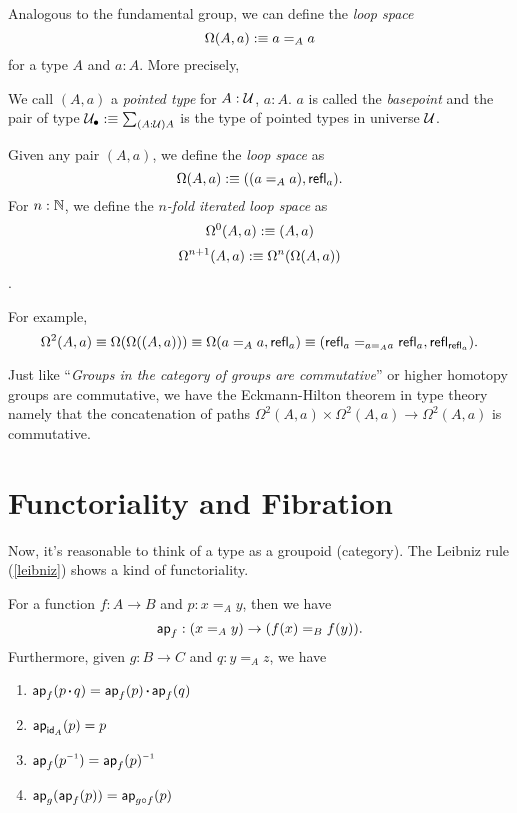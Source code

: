 Analogous to the fundamental group, we can define the {\it loop space} 
$$\Omega(A, a):\equiv a=_Aa$$ for a type $A$ and $a: A$. More precisely,

\newcommand{\pointed}{_\bullet}
\begin{definition}
    We call $(A, a)$ a {\it pointed type} for $A:\mathcal{U}$, $a:A$.
    $a$ is called the {\it basepoint} and the pair of type 
    $\universe\pointed\defn\sum_{(A:\universe)A}$ is the type of pointed 
    types in universe $\mathcal{U}$.
\end{definition}

\begin{definition}
    Given any pair $(A, a)$, we define the {\it loop space} as 
    $$ \Omega(A,a):\equiv ((a=_A a),\text{\sf refl}_a).$$
    For $n:\mathbb{N}$, we define the {\it$n$-fold iterated loop space} as
    $$\Omega^0(A,a):\equiv(A,a)$$
    $$\Omega^{n+1}(A,a):\equiv\Omega^n(\Omega(A, a))$$.
\end{definition}

For example, 
$$
    \Omega^2(A,a)\equiv\Omega(\Omega((A,a)))\equiv\Omega(a=_Aa,\text{\sf refl}_a)
    \equiv(\text{\sf refl}_a=_{a=_Aa}\text{\sf refl}_a, \text{\sf refl}_{\text{\sf refl}_a}).
$$

Just like ``{\it Groups in the category of groups are commutative}''
\cite{cat-awodey} or higher homotopy groups are commutative, we have
the Eckmann-Hilton theorem in type theory namely that the concatenation of 
paths $\Omega^2(A,a)\times\Omega^2(A,a)\to\Omega^2(A,a)$ is commutative.


\section{Functoriality and Fibration}

Now, it's reasonable to think of a type as a groupoid (category).
The Leibniz rule (\autoref{leibniz}) shows a kind of functoriality.

\newcommand{\ap}{\name{ap}}
\begin{lemma}
    For a function $f: A\to B$ and $p: x=_A y$, then we have
    $$
        \ap_f: (x=_A y)\to (f(x) =_B f(y)).
    $$
    Furthermore, given $g: B\to C$ and $q: y=_A z$, we have
    \begin{enumerate}
        \item $\ap_f(p\concat q)=\ap_f(p)\concat\ap_f(q)$
        \item $\ap_{\id_A}(p)=p$
        \item $\ap_f(p\inv)=\ap_f(p)\inv$
        \item $\ap_g(\ap_f(p))=\ap_{g\circ f}(p)$
    \end{enumerate}
\end{lemma}


